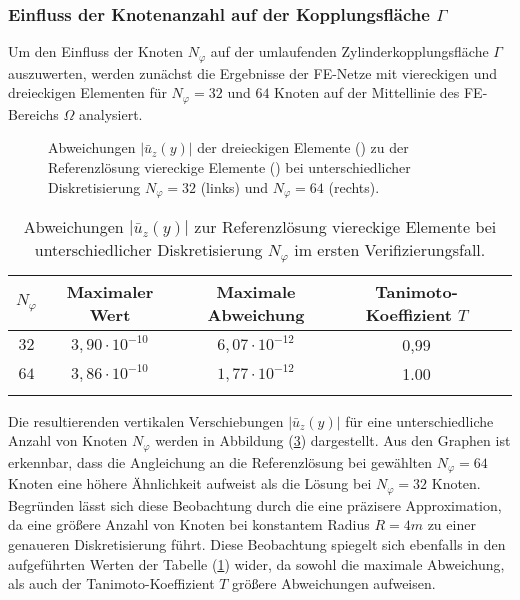 \subsubsection{Einfluss der Knotenanzahl auf der Kopplungsfläche $\Gamma$}
Um den Einfluss der Knoten $N_{\varphi}$ auf der umlaufenden Zylinderkopplungsfläche $\Gamma$ auszuwerten, werden zunächst die Ergebnisse der FE-Netze mit viereckigen und dreieckigen Elementen für $N_{\varphi} = 32$ und $64$ Knoten auf der Mittellinie des FE-Bereichs $\Omega$ analysiert.
\begin{figure}[H]
	\centering
	\begin{subfigure}{0.49\linewidth}
		\centering
		
		\label{fig:c1_a}
	\end{subfigure}\hfill
	\begin{subfigure}{0.49\linewidth}
		\centering
		
		\label{fig:c1_b}
	\end{subfigure}
	\caption{Abweichungen $|\bar{u}_z(y)|$ der dreieckigen Elemente (\legThree) zu der Referenzlösung viereckige Elemente (\legFour) bei unterschiedlicher Diskretisierung $N_{\varphi} = 32$ (links) und $N_{\varphi} = 64$ (rechts).}
	\label{fig:c1_Knoten}
\end{figure}
\begin{table}[htb]
	\centering
	\normalsize
	{\renewcommand{\arraystretch}{1.15}
		\begin{tabular}{ccccc}
			\firsthline
			$N_{\varphi}$ & Maximaler Wert & Maximale Abweichung & Tanimoto-Koeffizient $T$ \\\hline
			$ 32 $ & $ 3,90\cdot10^{-10}$ & $6,07\cdot10^{-12}$ & 0,99 \\
			$ 64 $ & $3,86\cdot10^{-10}$ & $1,77\cdot10^{-12}$ & 1.00 \\\lasthline
	\end{tabular}}
	\caption{Abweichungen $|\bar{u}_z(y)|$ zur Referenzlösung viereckige Elemente bei unterschiedlicher Diskretisierung $N_\varphi$ im ersten Verifizierungsfall.}
	\label{tab:Fehlermessung_c1}
\end{table}
Die resultierenden vertikalen Verschiebungen $|\bar{u}_z(y)|$ für eine unterschiedliche Anzahl von Knoten $N_{\varphi}$ werden in Abbildung (\ref{fig:c1_Knoten}) dargestellt. 
Aus den Graphen ist erkennbar, dass die Angleichung an die Referenzlösung bei gewählten $N_{\varphi} = 64$ Knoten eine höhere Ähnlichkeit aufweist als die Lösung bei $N_{\varphi} = 32$ Knoten.
Begründen lässt sich diese Beobachtung durch die eine präzisere Approximation, da eine größere Anzahl von Knoten bei konstantem Radius $R = 4 m$ zu einer genaueren Diskretisierung führt. 
Diese Beobachtung spiegelt sich ebenfalls in den aufgeführten Werten der Tabelle (\ref{tab:Fehlermessung_c1}) wider, da sowohl die maximale Abweichung, als auch der Tanimoto-Koeffizient $T$ größere Abweichungen aufweisen.

